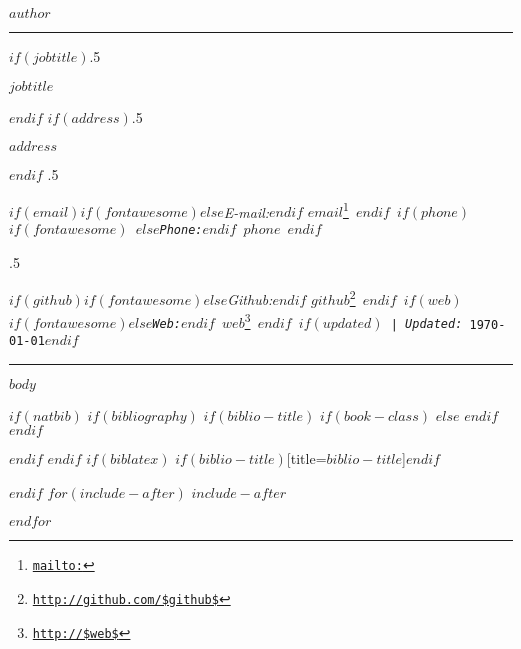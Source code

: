 \documentclass[$if(fontsize)$$fontsize$,$endif$$if(lang)$$babel-lang$,$endif$$if(papersize)$$papersize$paper,$endif$$for(classoption)$$classoption$$sep$,$endfor$]{$documentclass$}
\renewcommand{\href}[2]{#2\footnote{\url{#1}}}
\begin{document}
              
              
              \centerline{\huge \bf $author$}
              
              \vspace{2 mm}
              
              \hrule
              
              \vspace{2 mm}
              
              $if(jobtitle)$\moveleft.5\hoffset\centerline{$jobtitle$}$endif$
                $if(address)$\moveleft.5\hoffset\centerline{$address$}$endif$
                \moveleft.5\hoffset\centerline{ $if(email)$$if(fontawesome)$\faEnvelopeO \hspace{1 mm}$else$\emph{E-mail:}$endif$ \href{mailto:}{\tt $email$} \hspace{1 mm}$endif$ $if(phone)$$if(fontawesome)$ \faPhone \hspace{1 mm}$else$\emph{Phone:}$endif$  $phone$  \hspace{1 mm} $endif$}
                \moveleft.5\hoffset\centerline{ $if(github)$$if(fontawesome)$\faGithub \hspace{1 mm}$else$\emph{Github:}$endif$ \href{http://github.com/$github$}{\tt $github$} \hspace{1 mm} $endif$   $if(web)$$if(fontawesome)$\faGlobe \hspace{1 mm}$else$\emph{Web:}$endif$ \href{http://$web$}{\tt $web$}  $endif$ $if(updated)$ | \emph{Updated:} \today$endif$}
              
              \vspace{2 mm}
              
              \hrule
              
              
              $body$
                
                $if(natbib)$
                $if(bibliography)$
                $if(biblio-title)$
                $if(book-class)$
                \renewcommand\bibname{$biblio-title$}
              $else$
                \renewcommand\refname{$biblio-title$}
              $endif$
                $endif$
                
              
              $endif$
                $endif$
                $if(biblatex)$
                \printbibliography$if(biblio-title)$[title=$biblio-title$]$endif$
                
                $endif$
                $for(include-after)$
                $include-after$
                
                $endfor$
                
\end{document}
